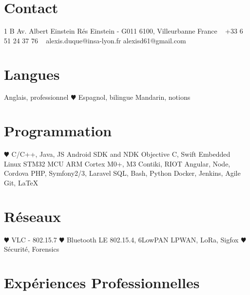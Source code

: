 \documentclass[]{cv-style}          %
\begin{document}
\lastupdated


\begin{aside}
%
\section{Contact}
1 B Av. Albert Einstein
Rés Einstein - G011
6100, Villeurbanne
France
~
+33 6 51 24 37 76
~
alexis.duque@insa-lyon.fr
alexisd61@gmail.com
%
\section{Langues}
Anglais, professionnel
{\color{red} $\varheartsuit$} Espagnol, bilingue
Mandarin, notions
%
\section{Programmation}
{\color{red} $\varheartsuit$} C/C++, Java, JS
Android SDK and NDK
Objective C, Swift
Embedded Linux
STM32 MCU
ARM Cortex M0+, M3
Contiki, RIOT
Angular, Node, Cordova
PHP, Symfony2/3, Laravel
SQL, Bash, Python
Docker, Jenkins, Agile
Git, \LaTeX{}
%
\section{Réseaux}
{\color{red} $\varheartsuit$} VLC - 802.15.7
{\color{red} $\varheartsuit$} Bluetooth LE
802.15.4, 6LowPAN
LPWAN, LoRa, Sigfox
{\color{red} $\varheartsuit$} Sécurité, Forensics
\end{aside}



 \vspace{0.15cm}

\section{Expériences Professionnelles}
\end{document}
